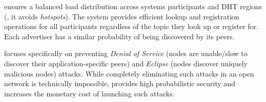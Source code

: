 \sysname ensures a balanced load distribution across systems participants and DHT regions (\ie, it avoids \emph{hotspots}).
The system provides efficient lookup and registration operations for all participants regardless of the topic they look up or register for.
Each advertiser has a similar probability of being discovered by its peers. 
 

\sysname focuses specifically on preventing \emph{Denial of Service} (nodes are unable/slow to discover their application-specific peers) and \emph{Eclipse} (nodes discover uniquely malicious nodes) attacks.
While completely eliminating such attacks in an open network is technically impossible, \sysname provides high probabilistic security 
and increases the monetary cost of launching such attacks. 
